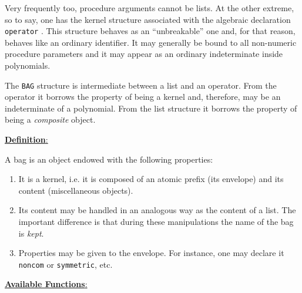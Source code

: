 Very frequently too, procedure arguments cannot be lists.
At the other extreme, so to say, one has the kernel
structure associated
with the algebraic declaration \texttt{operator} .  This structure behaves as
an ``unbreakable'' one and, for that reason, behaves
like an ordinary identifier.
It may generally be bound to all non-numeric procedure parameters
and it may appear
as an ordinary indeterminate inside polynomials.

The \texttt{BAG} structure is intermediate between a list and an operator.
From the operator it borrows the property of being a kernel and,
therefore, may be an indeterminate of a polynomial. From the list structure
it borrows the property of being a \emph{composite} object.

\underline{\textbf{Definition}:}

A bag is an object endowed with the following properties:
\begin{enumerate}
\item It is a kernel, i.e. it is composed of an atomic prefix (its
envelope) and
its content (miscellaneous objects).
\item Its content may be handled in an analogous way as the content of a
list. The important difference is that during these manipulations
the name of the bag is \emph{kept}.
\item Properties may be given to the envelope. For instance, one may
declare it \texttt{noncom} or \texttt{symmetric}, etc.
\end{enumerate}

\underline{\textbf{Available Functions}:}

